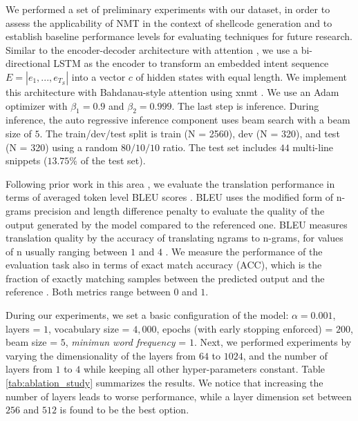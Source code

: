 \documentclass[11pt,a4paper]{article}
\begin{document}
We performed a set of preliminary experiments with our dataset, in order to assess the applicability of NMT in the context of shellcode generation and to establish baseline performance levels for evaluating techniques for future research. 
Similar to the encoder-decoder architecture with attention \cite{bahdanau2014neural}, we use a bi-directional LSTM as the encoder to transform an embedded intent sequence $E = |e_1,...,e_{T_S}|$ into a vector $c$ of hidden states with equal length. We implement this architecture with Bahdanau-style attention \cite{bahdanau2014neural} using {\selectfont xnmt} \cite{neubig-etal-2018-xnmt}. We use an Adam optimizer \cite{kingma2014adam} with $\beta_1=0.9$ and $\beta_2=0.999$. The last step is inference. During inference, the auto regressive inference component uses beam search with a beam size of $5$. The train/dev/test split is train (N = 2560), dev (N = 320), and test (N = 320) using a random $80/10/10$ ratio. The test set includes $44$ multi-line snippets ($13.75\%$ of the test set).


Following prior work in this area \cite{DBLP:journals/corr/LingGHKSWB16,DBLP:journals/corr/YinN17,oda2015learning}, we evaluate the translation performance in terms of averaged token level BLEU scores \cite{papineni2002bleu}.
BLEU uses the modified form of n-grams precision and length difference penalty to evaluate the quality of the output generated by the model compared to the referenced one. BLEU measures translation quality by the accuracy of translating ngrams to n-grams, for values of n usually ranging between $1$ and $4$ \cite{han2016machine,munkova2020evaluation}.
We measure the performance of the evaluation task also in terms of exact match accuracy (ACC), which is the fraction of exactly matching samples between the predicted output and the reference  \cite{DBLP:journals/corr/YinN17}. 
Both metrics range between $0$ and $1$.




 
During our experiments, we set a basic configuration of the model: $\alpha = 0.001$, layers = $1$, vocabulary size = $4,000$, epochs (with early stopping enforced) = $200$, beam size = $5$, \textit{minimun word frequency} = $1$. Next, we performed experiments by varying the dimensionality of the layers from $64$ to $1024$, and the number of layers from $1$ to $4$ while keeping all other hyper-parameters constant. 
Table \ref{tab:ablation_study} summarizes the results. We notice that increasing the number of layers leads to worse performance, while a layer dimension set between $256$ and $512$ is found to be the best option. 
\end{document}

